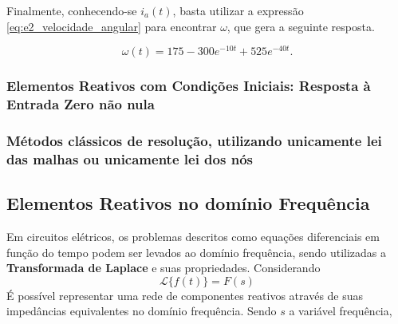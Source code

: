 \documentclass{article}
\numberwithin{equation}{section}
\begin{document}
\noindent Finalmente, conhecendo-se $i_a(t)$, basta utilizar a expressão \eqref{eq:e2_velocidade_angular} para encontrar $\omega$, que gera a seguinte resposta.

\begin{equation}
    \omega(t) = 175 - 300e^{-10t} + 525e^{-40t}.
\end{equation}

\subsubsection{Elementos Reativos com Condições Iniciais: Resposta à Entrada Zero não nula}
\label{subsubsec:entradazeronaonula}

\subsubsection{Métodos clássicos de resolução, utilizando unicamente lei das malhas ou unicamente lei dos nós}
\label{subsubsec:classicos}

\subsection{Elementos Reativos no domínio Frequência}
\label{subesc:frequencia}
Em circuitos elétricos, os problemas descritos como equações diferenciais em função do tempo podem ser levados ao domínio frequência, sendo utilizadas a \textbf{Transformada de Laplace} e suas propriedades. Considerando
$$\mathscr{L}\{f(t)\}=F(s)$$
É possível representar uma rede de componentes reativos através de suas impedâncias equivalentes no domínio frequência. Sendo $s$ a variável frequência,
\end{document}
